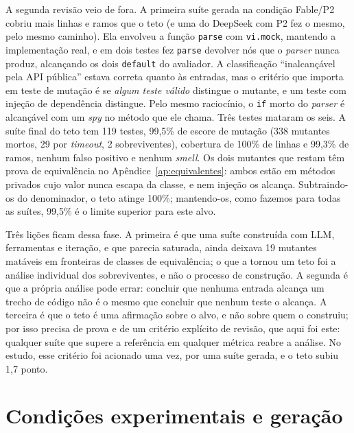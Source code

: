 A segunda revisão veio de fora. A primeira suíte gerada na condição Fable/P2 cobriu mais linhas e ramos que o teto (e uma do DeepSeek com P2 fez o mesmo, pelo mesmo caminho). Ela envolveu a função \texttt{parse} com \texttt{vi.mock}, mantendo a implementação real, e em dois testes fez \texttt{parse} devolver nós que o \textit{parser} nunca produz, alcançando os dois \texttt{default} do avaliador. A classificação ``inalcançável pela API pública'' estava correta quanto às entradas, mas o critério que importa em teste de mutação é se \textit{algum teste válido} distingue o mutante, e um teste com injeção de dependência distingue. Pelo mesmo raciocínio, o \texttt{if} morto do \textit{parser} é alcançável com um \textit{spy} no método que ele chama. Três testes mataram os seis. A suíte final do teto tem 119 testes, 99,5\% de escore de mutação (338 mutantes mortos, 29 por \textit{timeout}, 2 sobreviventes), cobertura de 100\% de linhas e 99,3\% de ramos, nenhum falso positivo e nenhum \textit{smell}. Os dois mutantes que restam têm prova de equivalência no Apêndice~\ref{ap:equivalentes}: ambos estão em métodos privados cujo valor nunca escapa da classe, e nem injeção os alcança. Subtraindo-os do denominador, o teto atinge 100\%; mantendo-os, como fazemos para todas as suítes, 99,5\% é o limite superior para este alvo.

Três lições ficam dessa fase. A primeira é que uma suíte construída com LLM, ferramentas e iteração, e que parecia saturada, ainda deixava 19 mutantes matáveis em fronteiras de classes de equivalência; o que a tornou um teto foi a análise individual dos sobreviventes, e não o processo de construção. A segunda é que a própria análise pode errar: concluir que nenhuma entrada alcança um trecho de código não é o mesmo que concluir que nenhum teste o alcança. A terceira é que o teto é uma afirmação sobre o alvo, e não sobre quem o construiu; por isso precisa de prova e de um critério explícito de revisão, que aqui foi este: qualquer suíte que supere a referência em qualquer métrica reabre a análise. No estudo, esse critério foi acionado uma vez, por uma suíte gerada, e o teto subiu 1,7 ponto.

\section{Condições experimentais e geração}
\label{sec:condicoes}

